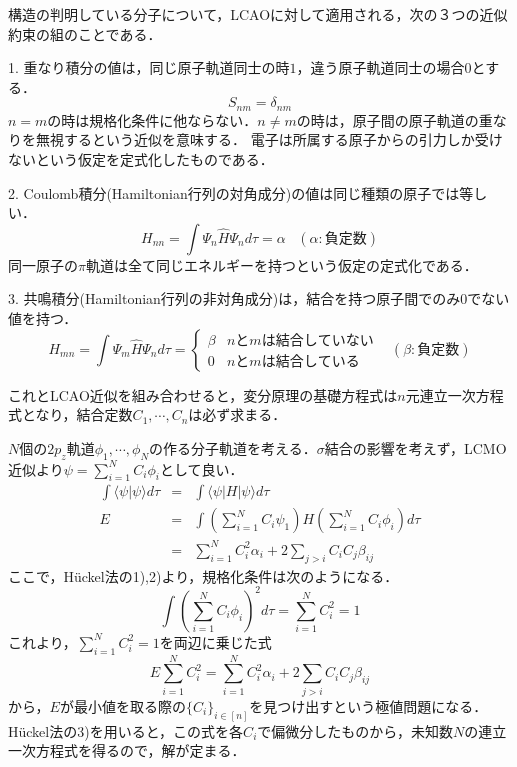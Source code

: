 \documentclass[uplatex, dvipdfmx]{jsreport}
\begin{document}
\begin{theory}
    構造の判明している分子について，LCAOに対して適用される，次の３つの近似約束の組のことである．

    1. 重なり積分の値は，同じ原子軌道同士の時$1$，違う原子軌道同士の場合$0$とする．
    \[ S_{nm}=\delta_{nm} \]
    $n=m$の時は規格化条件に他ならない．$n\ne m$の時は，原子間の原子軌道の重なりを無視するという近似を意味する．
    電子は所属する原子からの引力しか受けないという仮定を定式化したものである．

    2. Coulomb積分(Hamiltonian行列の対角成分)の値は同じ種類の原子では等しい．
    \[ H_{nn}=\int\Psi_n\hat{H}\Psi_n d\tau = \alpha \;\;\; (\alpha :負定数) \]
    同一原子の$\pi$軌道は全て同じエネルギーを持つという仮定の定式化である．

    3. 共鳴積分(Hamiltonian行列の非対角成分)は，結合を持つ原子間でのみ$0$でない値を持つ．
    \[ H_{mn}=\int\Psi_m\hat{H}\Psi_n d\tau = \begin{cases}
        \beta & nとmは結合していない \\
        0 & nとmは結合している
    \end{cases} \;\;\; (\beta :負定数) \]

    これとLCAO近似を組み合わせると，変分原理の基礎方程式は$n$元連立一次方程式となり，結合定数$C_1,\cdots, C_n$は必ず求まる．
\end{theory}
\begin{example}
    $N$個の$2p_z$軌道$\phi_1,\cdots,\phi_N$の作る分子軌道を考える．$\sigma$結合の影響を考えず，LCMO近似より$\psi=\sum^N_{i=1}C_i\phi_i$として良い．
    \begin{eqnarray*}
        \int\langle\psi|\psi\rangle d\tau &=& \int\langle\psi|H|\psi\rangle d\tau \\
        E&=& \int\left( \sum^N_{i=1}C_i\psi_1 \right) H\left( \sum^N_{i=1}C_i\phi_i \right)d\tau \\
        &=& \sum^N_{i=1}C_i^2\alpha_i + 2\sum_{j>i}C_iC_j\beta_{ij}
    \end{eqnarray*}
    ここで，Hückel法の1),2)より，規格化条件は次のようになる．
    \[ \int\left( \sum^N_{i=1}C_i\phi_i \right)^2d\tau = \sum^N_{i=1}C_i^2=1 \]
    これより，$\sum^N_{i=1}C_i^2=1$を両辺に乗じた式
    \[ E\sum^N_{i=1}C_i^2=\sum^N_{i=1}C_i^2\alpha_i + 2\sum_{j>i}C_iC_j\beta_{ij} \]
    から，$E$が最小値を取る際の$\{C_i\}_{i\in [n]}$を見つけ出すという極値問題になる．
    Hückel法の3)を用いると，この式を各$C_i$で偏微分したものから，未知数$N$の連立一次方程式を得るので，解が定まる．
\end{example}
\end{document}
